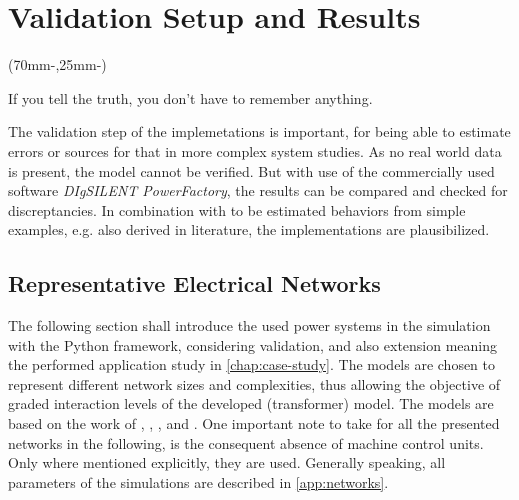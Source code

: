 

\chapter{Validation Setup and Results}
\label{chap:verification}

\begin{textblock*}{.7\textwidth}(70mm-\offset,25mm-\offset)
    \begin{fquote}
        If you tell the truth, you don't have to remember anything.
    \end{fquote}
\end{textblock*}

The validation step of the implemetations is important, for being able to estimate errors or sources for that in more complex system studies.
As no real world data is present, the model cannot be verified.
But with use of the commercially used software \textit{DIgSILENT PowerFactory}, the results can be compared and checked for discreptancies.
In combination with to be estimated behaviors from simple examples, e.g. also derived in literature, the implementations are plausibilized.

\section{Representative Electrical Networks}
\label{sec:networks}

The following section shall introduce the used power systems in the simulation with the Python framework, considering validation, and also extension meaning the performed application study in \autoref{chap:case-study}. 
The models are chosen to represent different network sizes and complexities, thus allowing the objective of graded interaction levels of the developed (transformer) model. 
The models are based on the work of \textcite{machowski_2020}, \textcite{kundur_2022}, \textcite{IEEELoadModeling_2022}, and \textcite{vancutsem_2020}.
One important note to take for all the presented networks in the following, is the consequent absence of machine control units. 
Only where mentioned explicitly, they are used.
Generally speaking, all parameters of the simulations are described in \autoref{app:networks}.

